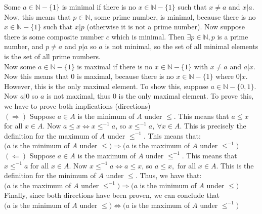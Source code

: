 \documentclass[12pt, a4paper]{exam}
\begin{document}
\begin{questions}
	\pointsdroppedatright
	\question
\vspace{0.2in}
	\pointsdroppedatright
	\question Some $a \in \mathbb{N}-\{1\}$ is minimal if there is no $x \in \mathbb{N}-\{1\}$ such that $x \ne a$ and $x | a$. Now, this means that $p \in \mathbb{N}$, some prime number, is minimal, because there is no $x \in \mathbb{N}-\{1\}$ such that $x | p$ (otherwise it is not a prime number). Now suppose there is some composite number $c$ which is minimal. Then $\exists p \in \mathbb{N}, p $ is a prime number, and $p \ne a$ and $p | a$ so $a$ is not minimal, so the set of all minimal elements is the set of all prime numbers. \\ Now some $a \in \mathbb{N}-\{1\}$ is maximal if there is no $x \in \mathbb{N}-\{1\}$ with $x \ne a$ and $a | x$. Now this means that $0$ is maximal, because there is no $x \in \mathbb{N}-\{1\}$ where $0 | x$. However, this is the only maximal element. To show this, suppose $a \in \mathbb{N}-\{0,1\}$. Now $a | 0$ so $a$ is not maximal, thus $0$ is the only maximal element. 
		\vspace{0.05in}
		\question  To prove this, we have to prove both implications (directions) \\ $(\Longrightarrow)$ Suppose $a \in A$ is the minimum of $A$ under $\le$. This means that $a \le x$ for all $x \in A$. Now $a \le x \iff x \le ^{-1} a$, so $x \le ^{-1} a, \  \forall x \in A$. This is precisely the definition for the maximum of $A$ under $\le ^{-1}$. This means that: \\ $(a$ is the minimum of $A$ under $\le) \Longrightarrow (a$ is the maximum of $A$ under $\le ^{-1})$ \\ 
		
		$(\Longleftarrow)$  Suppose $a \in A$ is the maximum of $A$ under $\le ^{-1}$. This means that $x \le ^{-1} a$ for all $x \in A$. Now $x \le ^{-1} a \iff a \le x$, so $a \le x, $ for all $ x \in A$. This is the definition for the minimum of $A$ under $\le$. Thus, we have that: \\ $(a$ is the maximum of $A$ under $\le ^{-1}) \Longrightarrow (a$ is the minimum of $A$ under $\le)$ \\ 
		Finally, since both directions have been proven, we can conclude that \\ $(a$ is the minimum of $A$ under $\le) \iff (a$ is the maximum of $A$ under $\le ^{-1})$
\end{questions}
\vspace{0.75in}
\end{document}
